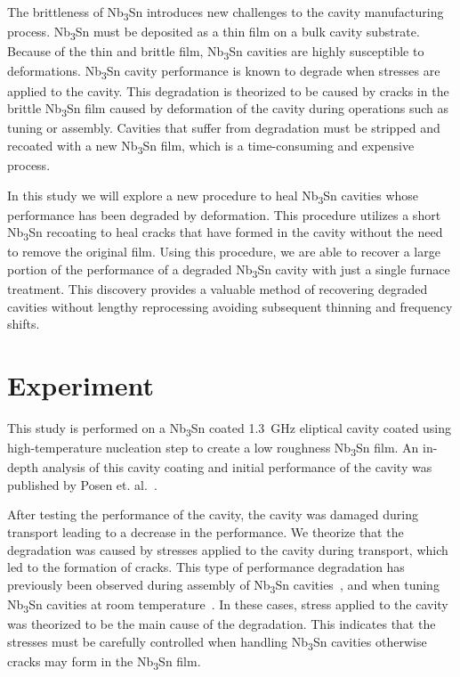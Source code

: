 \documentclass{revtex4-2}
\begin{document}
The brittleness of Nb\textsubscript{3}Sn introduces new challenges to the cavity manufacturing process. Nb\textsubscript{3}Sn must be deposited as a thin film on a bulk cavity substrate.\cite{posen2017nb3sn, pudasaini2019growth, porter2018update} Because of the thin and brittle film, Nb\textsubscript{3}Sn cavities are highly susceptible to deformations. Nb\textsubscript{3}Sn cavity performance is known to degrade when stresses are applied to the cavity.\cite{eremeev2023preservation, eremeev:srf2019-mop015} This degradation is theorized to be caused by cracks in the brittle Nb\textsubscript{3}Sn film caused by deformation of the cavity during operations such as tuning or assembly. Cavities that suffer from degradation must be stripped and recoated with a new Nb\textsubscript{3}Sn film, which is a time-consuming and expensive process.

In this study we will explore a new procedure to heal Nb\textsubscript{3}Sn cavities whose performance has been degraded by deformation. This procedure utilizes a short Nb\textsubscript{3}Sn recoating to heal cracks that have formed in the cavity without the need to remove the original film. Using this procedure, we are able to recover a large portion of the performance of a degraded Nb\textsubscript{3}Sn cavity with just a single furnace treatment. This discovery provides a valuable method of recovering degraded cavities without lengthy reprocessing avoiding subsequent thinning and frequency shifts.


\section{Experiment}
\label{sec:Experiment}

This study is performed on a Nb\textsubscript{3}Sn coated \qty{1.3}{\giga\hertz} eliptical cavity coated using high-temperature nucleation step to create a low roughness Nb\textsubscript{3}Sn film. An in-depth analysis of this cavity coating and initial performance of the cavity was published by Posen et. al.~\cite{posen2021advances}. 

After testing the performance of the cavity, the cavity was damaged during transport leading to a decrease in the performance. We theorize that the degradation was caused by stresses applied to the cavity during transport, which led to the formation of cracks. This type of performance degradation has previously been observed during assembly of Nb\textsubscript{3}Sn cavities~\cite{eremeev2023preservation}, and when tuning Nb\textsubscript{3}Sn cavities at room temperature~\cite{eremeev:srf2019-mop015}. In these cases, stress applied to the cavity was theorized to be the main cause of the degradation. This indicates that the stresses must be carefully controlled when handling Nb\textsubscript{3}Sn cavities otherwise cracks may form in the Nb\textsubscript{3}Sn film.
\end{document}
